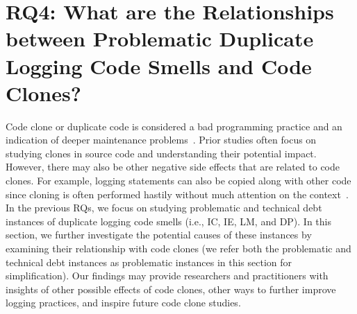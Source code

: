 
\section{RQ4: What are the Relationships between Problematic Duplicate Logging Code Smells and Code Clones?}

\label{sec:clone}


Code clone or duplicate code is considered a bad programming practice and an indication of deeper maintenance problems~\cite{refactoring1999}. Prior studies often focus on studying clones in source code and understanding their potential impact. However, there may also be other negative side effects that are related to code clones. For example, logging statements can also be copied along with other code since cloning is often performed hastily without much attention on the context~\cite{5463343}. In the previous RQs, we focus on studying problematic and technical debt instances of duplicate logging code smells (i.e., IC, IE, LM, and DP). In this section, we further investigate the potential causes of these instances by examining their relationship with code clones (we refer both the problematic and technical debt instances as problematic instances in this section for simplification). Our findings may provide researchers and practitioners with insights of other possible effects of code clones, other ways to further improve logging practices, and inspire future code clone studies.


